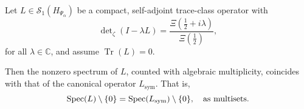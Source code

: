 \begin{lemma}
\label{lem:determinant_fixes_spectrum}
Let \( L \in \mathcal{S}_1(H_{\Psi_\alpha}) \) be a compact, self-adjoint trace-class operator with
\[
\det\nolimits_\zeta(I - \lambda L) = \frac{\Xi(\tfrac{1}{2} + i\lambda)}{\Xi(\tfrac{1}{2})},
\]
for all \( \lambda \in \mathbb{C} \), and assume \( \operatorname{Tr}(L) = 0 \).

Then the nonzero spectrum of \( L \), counted with algebraic multiplicity, coincides with that of the canonical operator \( L_{\mathrm{sym}} \). That is,
\[
\operatorname{Spec}(L) \setminus \{0\} = \operatorname{Spec}(L_{\mathrm{sym}}) \setminus \{0\},
\quad \text{as multisets}.
\]
\end{lemma}
% 